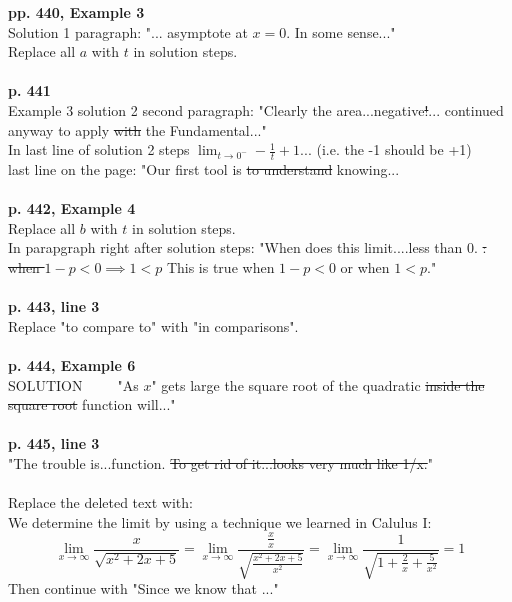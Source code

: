 \documentclass[11pt]{report}
\begin{document}
\textbf{pp. 440, Example 3}\\
Solution 1 paragraph: "... asymptote at $x=0$. In some sense..."\\
Replace all $a$ with $t$ in solution steps.\\ \\

\textbf{p. 441}\\
Example 3 solution 2 second paragraph: "Clearly the area...negative\sout{!}... continued anyway to apply \sout{with} the Fundamental..."\\

In last line of solution 2 steps $\displaystyle \lim_{t \to 0^-} -\frac{1}{t}+ 1...$ (i.e. the -1 should be +1)\\

last line on the page: "Our first tool is \sout{to understand} knowing... \\ \\

\textbf{p. 442, Example 4}\\
Replace all $b$ with $t$ in solution steps.\\
In parapgraph right after solution steps: "When does this limit....less than $0$. \sout{: when $1-p<0 \implies 1<p$} This is true when $1-p < 0$ or when $1<p$."\\ \\

\textbf{p. 443, line 3}\\
Replace "to compare to" with "in comparisons".\\ \\

\textbf{p. 444, Example 6}\\
SOLUTION~~~~~"As $x$" gets large the square root of the quadratic \sout{inside the square root} function will..."\\ \\

\textbf{p. 445, line 3}\\
"The trouble is...function. \sout{To get rid of it...looks very much like 1/x.}"\\ \\
Replace the deleted text with:\\
We determine the limit by using a technique we learned in Calulus I:
$$\lim_{x \to \infty} \frac{x}{\sqrt{x^2+2x+5}}=\lim_{x \to \infty} \frac{\frac{x}{x}}{{\sqrt{\frac{x^2+2x+5}{x^2}}}}=\lim_{x \to \infty} \frac{1}{\sqrt{1+\frac{2}{x}+ \frac{5}{x^2}}}=1$$
Then continue with "Since we know that ..."\\
\end{document}
